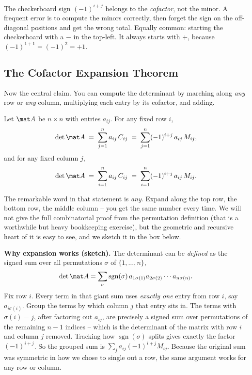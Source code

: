 \begin{trapbox}
The checkerboard sign $(-1)^{i+j}$ belongs to the \emph{cofactor}, not the minor. A frequent error is
to compute the minors correctly, then forget the sign on the off-diagonal positions and get the wrong
total. Equally common: starting the checkerboard with a $-$ in the top-left. It always starts with
$+$, because $(-1)^{1+1}=(-1)^2=+1$.
\end{trapbox}

\subsection{The Cofactor Expansion Theorem}

Now the central claim. You can compute the determinant by marching along \emph{any} row or
\emph{any} column, multiplying each entry by its cofactor, and adding.

\begin{theorem}\label{ch22:thm-expansion}
Let $\mat A$ be $n\times n$ with entries $a_{ij}$. For any fixed row $i$,
\[
\det\mat A \;=\; \sum_{j=1}^{n} a_{ij}\,C_{ij}
\;=\; \sum_{j=1}^{n} (-1)^{i+j}\,a_{ij}\,M_{ij},
\]
and for any fixed column $j$,
\[
\det\mat A \;=\; \sum_{i=1}^{n} a_{ij}\,C_{ij}
\;=\; \sum_{i=1}^{n} (-1)^{i+j}\,a_{ij}\,M_{ij}.
\]
\end{theorem}

The remarkable word in that statement is \emph{any}. Expand along the top row, the bottom row, the
middle column -- you get the same number every time. We will not give the full combinatorial proof
from the permutation definition (that is a worthwhile but heavy bookkeeping exercise), but the
geometric and recursive heart of it is easy to see, and we sketch it in the box below.

\begin{formalbox}
\textbf{Why expansion works (sketch).} The determinant can be \emph{defined} as the signed sum over
all permutations $\sigma$ of $\{1,\dots,n\}$,
\[
\det\mat A=\sum_{\sigma}\operatorname{sgn}(\sigma)\,a_{1\sigma(1)}a_{2\sigma(2)}\cdots a_{n\sigma(n)}.
\]
Fix row $i$. Every term in that giant sum uses \emph{exactly one} entry from row $i$, say
$a_{i\sigma(i)}$. Group the terms by which column $j$ that entry sits in. The terms with
$\sigma(i)=j$, after factoring out $a_{ij}$, are precisely a signed sum over permutations of the
remaining $n-1$ indices -- which is the determinant of the matrix with row $i$ and column $j$
removed. Tracking how $\operatorname{sgn}(\sigma)$ splits gives exactly the factor $(-1)^{i+j}$. So
the grouped sum is $\sum_j a_{ij}(-1)^{i+j}M_{ij}$. Because the original sum was symmetric in how we
chose to single out a row, the same argument works for any row or column.
\end{formalbox}

